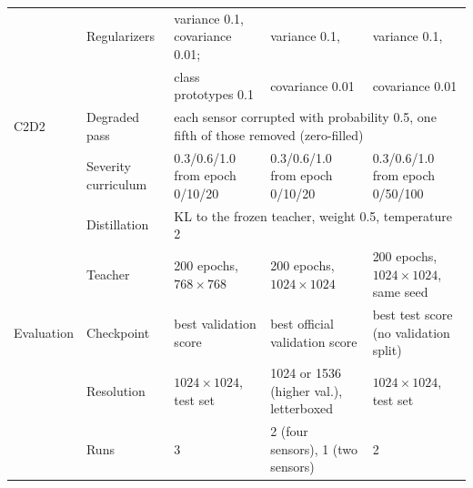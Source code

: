 \begin{table}[p]
\begin{tabular*}{\textwidth}{@{\extracolsep{\fill}}lllll@{}}
 & Regularizers & variance 0.1, covariance 0.01; & variance 0.1, & variance 0.1, \\
 & & class prototypes 0.1 & covariance 0.01 & covariance 0.01 \\
\midrule
C2D2 & Degraded pass & \multicolumn{3}{l}{each sensor corrupted with probability 0.5, one fifth of those removed (zero-filled)} \\
 & Severity curriculum & 0.3/0.6/1.0 from epoch 0/10/20 & 0.3/0.6/1.0 from epoch 0/10/20 & 0.3/0.6/1.0 from epoch 0/50/100 \\
 & Distillation & \multicolumn{3}{l}{KL to the frozen teacher, weight 0.5, temperature 2} \\
 & Teacher & 200 epochs, $768\times768$ & 200 epochs, $1024\times1024$ & 200 epochs, $1024\times1024$, same seed \\
\midrule
Evaluation & Checkpoint & best validation score & best official validation score & best test score (no validation split) \\
 & Resolution & $1024\times1024$, test set & 1024 or 1536 (higher val.), letterboxed & $1024\times1024$, test set \\
 & Runs & 3 & 2 (four sensors), 1 (two sensors) & 2 \\
\bottomrule
\end{tabular*}
\end{table}

